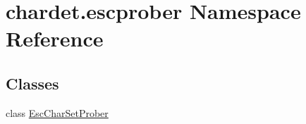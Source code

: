 \hypertarget{namespacechardet_1_1escprober}{}\section{chardet.\+escprober Namespace Reference}
\label{namespacechardet_1_1escprober}
\subsection*{Classes}
\begin{DoxyCompactItemize}
\item 
class \hyperlink{classchardet_1_1escprober_1_1_esc_char_set_prober}{Esc\+Char\+Set\+Prober}
\end{DoxyCompactItemize}
